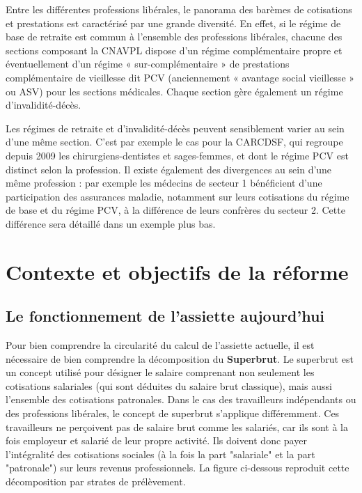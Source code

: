 Entre les différentes professions libérales, le panorama des barèmes de cotisations et prestations est caractérisé par une grande diversité. En effet, si le régime de base de retraite est commun à l’ensemble des professions libérales, chacune des sections composant la CNAVPL dispose d’un régime complémentaire propre et éventuellement d’un régime « sur-complémentaire » de prestations complémentaire de vieillesse dit PCV (anciennement « avantage social vieillesse » ou ASV) pour les sections médicales. Chaque section gère également un régime d’invalidité-décès.

Les régimes de retraite et d’invalidité-décès peuvent sensiblement varier au sein d’une même section. C’est par exemple le cas pour la CARCDSF, qui regroupe depuis 2009 les chirurgiens-dentistes et sages-femmes, et dont le régime PCV est distinct selon la profession. Il existe également des divergences au sein d’une même profession : par exemple les médecins de secteur 1 bénéficient d’une participation des assurances maladie, notamment sur leurs cotisations du régime de base et du régime PCV, à la différence de leurs confrères du secteur 2. Cette différence sera détaillé dans un exemple plus bas.

\section{Contexte et objectifs de la réforme}
\label{sec:2.2}

\subsection{Le fonctionnement de l'assiette aujourd'hui}

Pour bien comprendre la circularité du calcul de l'assiette actuelle, il est nécessaire de bien comprendre la décomposition du \textbf{Superbrut}. Le superbrut est un concept utilisé pour désigner le salaire comprenant non seulement les cotisations salariales (qui sont déduites du salaire brut classique), mais aussi l'ensemble des cotisations patronales. Dans le cas des travailleurs indépendants ou des professions libérales, le concept de superbrut s'applique différemment. Ces travailleurs ne perçoivent pas de salaire brut comme les salariés, car ils sont à la fois employeur et salarié de leur propre activité. Ils doivent donc payer l'intégralité des cotisations sociales (à la fois la part "salariale" et la part "patronale") sur leurs revenus professionnels. La figure ci-dessous reproduit cette décomposition par strates de prélèvement.  

